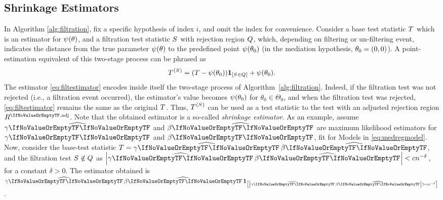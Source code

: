 \documentclass[ejs, twoside]{imsart}
\theoremstyle{plain}
\theoremstyle{remark}
\newcommand{\fullstop}{\text{.}}
\newcommand{\estim}[1]{\widehat{\regcoef{#1}}}
\numberwithin{equation}{section}
\numberwithin{table}{section}
\numberwithin{figure}{section}
\let\originalleft\left
\let\originalright\right
\renewcommand{\left}{\mathopen{}\mathclose\bgroup\originalleft}
\renewcommand{\right}{\aftergroup\egroup\originalright}
\begin{document}
\subsection{Shrinkage Estimators} \label{sec:filt-shrinkage}

In Algorithm \ref{alg:filtration}, fix a specific hypothesis of index \(i\), and omit the index for convenience. Consider a base test statistic \(\basestat\) which is an estimator for \(\psi\left(\theta \right) \), and a filtration test statistic \(\filtstat\) with rejection region \(\filtrr\), which, depending on filtering or un-filtering event, indicates the distance from the true parameter \(\psi\left(\theta \right) \) to the predefined point \(\psi\left(\theta_0 \right) \) (in the mediation hypothesis, \(\theta_0 = \left(0,0 \right) \)). A point-estimation equivalent of this two-stage process can be phrased as
\begin{equation} \label{eq:filtestimator}
	\shrinkestim = \left(T - \psi\left(\theta_0\right)\right) \indc{\nfilevent} + \psi\left( \theta_0\right) \fullstop
\end{equation}
The estimator \eqref{eq:filtestimator} encodes inside itself the two-stage process of Algorithm~\ref{alg:filtration}. Indeed, if the filtration test was not rejected (i.e., a filtration event occurred), the estimator's value becomes \(\psi\left(\theta_0 \right) \) for \(\theta_0 \in \Theta_0\), and when the filtration test was rejected, \eqref{eq:filtestimator} remains the same as the original \(\basestat\). Thus, \(\shrinkestim\) can be used as a test statistic to the test with an adjusted rejection region \(\baserradj\). Note that the obtained estimator is a so-called \emph{shrinkage estimator}. As an example, assume \(\estim{1}\) and \(\estim{2}\) are maximum likelihood estimators for \(\regcoef{1}\) and \(\regcoef{2}\), fit for Models in \eqref{eq:medregmodel}. Now, consider the base-test statistic \(T = \product\),  and the filtration test \(\filevent\) as \(\left| \product \right| < cn^{-\delta} \), for a constant \(\delta > 0 \). The estimator obtained is \(\product \,\indc{\left| \product \right| > cn^{-\delta} }\).
\end{document}
